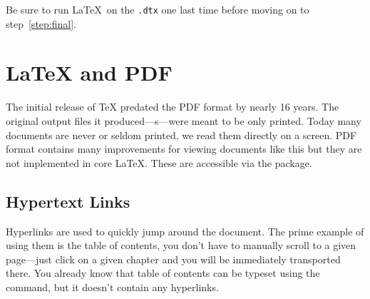 \noindent Be sure to run \LaTeX\ on the \texttt{.dtx} one last
time before moving on to step~\ref{step:final}.


\section{\LaTeX{} and PDF}\label{sec:pdftex}
\begingroup
{}

The initial release of \TeX{} predated the PDF format by nearly 16 years. The
original output files it produced---s---were meant to be only
printed. Today many documents are never or seldom printed, we read them
directly on a screen. PDF format contains many improvements for viewing
documents like this but they are not implemented in core \LaTeX{}. These are
accessible via the  package.

\subsection{Hypertext Links}\label{hyperlinks}

Hyperlinks are used to quickly jump around the document. The prime example of
using them is the table of contents, you don't have to manually scroll to a
given page---just click on a given chapter and you will be immediately
transported there. You already know that table of contents can be typeset using
the  command, but it doesn't contain any hyperlinks.

